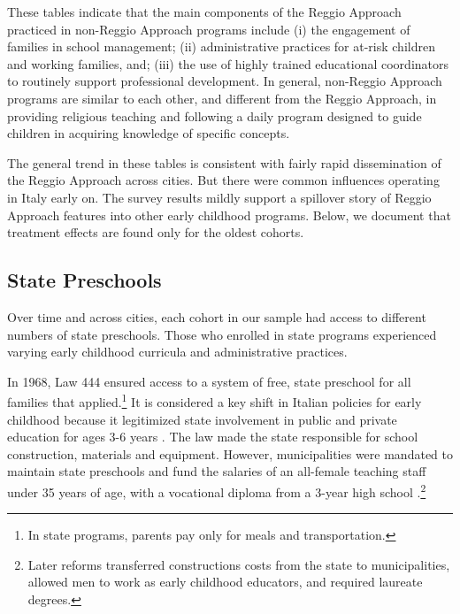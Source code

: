 These tables indicate that the main components of the Reggio Approach practiced in non-Reggio Approach programs include (i) the engagement of families in school management; (ii) administrative practices for at-risk children and working families, and; (iii) the use of highly trained educational coordinators to routinely support professional development. In general, non-Reggio Approach programs are similar to each other, and different from the Reggio Approach, in providing religious teaching and following a daily program designed to guide children in acquiring knowledge of specific concepts. 

The general trend in these tables is consistent with fairly rapid dissemination of the Reggio Approach across cities. But there were common influences operating in Italy early on.  The survey results mildly support a spillover story of Reggio Approach features into other early childhood programs. Below, we document that treatment effects are found only for the oldest cohorts. 

\subsection{State Preschools}

Over time and across cities, each cohort in our sample had access to different numbers of state preschools. Those who enrolled in state programs experienced varying early childhood curricula and administrative practices.

In 1968, Law 444 ensured access to a system of free, state preschool for all families that applied.\footnote{In state programs, parents pay only for meals and transportation.} It is considered a key shift in Italian policies for early childhood because it legitimized state involvement in public and private education for ages 3-6 years \citep{Hohnerlein_2009_Paradox-Public-Preschools}. The law made the state responsible for school construction, materials and equipment. However, municipalities were mandated to maintain state preschools and fund the salaries of an all-female teaching staff under 35 years of age, with a vocational diploma from a 3-year high school \citep{OECD_2001_Italy-Country-Note}.\footnote{Later reforms transferred constructions costs from the state to municipalities, allowed men to work as early childhood educators, and required laureate degrees.} 

